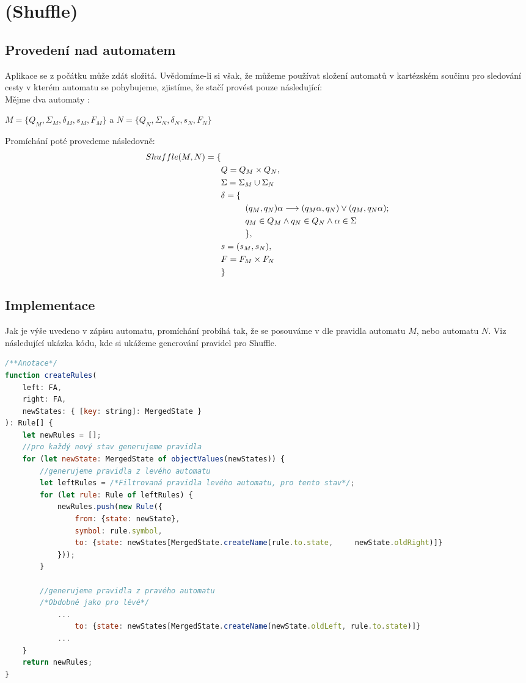 \section{(Shuffle)}
\subsection{Provedení nad automatem}
Aplikace se z počátku může zdát složitá. Uvědomíme-li si však, že můžeme používat složení automatů v kartézském součinu pro sledování cesty v kterém automatu se pohybujeme, zjistíme, že stačí provést pouze následující:\\
Mějme dva automaty :

$M=\{Q_{M}, \Sigma_{M}, \delta_{M},s_{M}, F_{M}\}$ a $N=\{Q_{N}, \Sigma_{N}, \delta_{N},s_{N}, F_{N}\} $

Promíchání poté provedeme následovně:
\begin{equation}
\label{eqA:Intersection}
\begin{split}
Shuffle(M,N) = \{ &\\
 & Q = Q_{M} \times Q_{N},\\
 &   \Sigma = \Sigma_{M} \cup \Sigma_{N} \\
    &   \delta = \{ \\
    & \hspace*{1cm} (q_{M},q_{N})\alpha \longrightarrow (q_{M}\alpha, q_{N}) \vee (q_{M},q_{N}\alpha);\\
    & \hspace*{1cm} q_{M} \in Q_{M} \land q_{N} \in Q_{N} \land \alpha \in \Sigma\\
    & \hspace*{1cm} \}, \\
    &  s = (s_{M}, s_{N}), \\
    & F = F_{M} \times F_{N} \\
    & \}
\end{split}
\end{equation}

\subsection{Implementace}
Jak je výše uvedeno v zápisu automatu, promíchání probíhá tak, že se posouváme v dle pravidla automatu $M$, nebo automatu $N$. Viz následující ukázka kódu, kde si ukážeme generování pravidel pro Shuffle.
\begin{lstlisting}[language=JavaScript, caption={Ukázka generování přechodů pro shuffle (\textit{src/operations/shuffleFA.js})}, label=example:shuffle]
/**Anotace*/
function createRules(
	left: FA,
	right: FA,
	newStates: { [key: string]: MergedState }
): Rule[] {
	let newRules = [];
	//pro každý nový stav generujeme pravidla
	for (let newState: MergedState of objectValues(newStates)) {
		//generujeme pravidla z levého automatu
		let leftRules = /*Filtrovaná pravidla levého automatu, pro tento stav*/;
		for (let rule: Rule of leftRules) {
			newRules.push(new Rule({
				from: {state: newState},
				symbol: rule.symbol,
				to: {state: newStates[MergedState.createName(rule.to.state, 	newState.oldRight)]}
			}));
		}

		//generujeme pravidla z pravého automatu
		/*Obdobně jako pro lévé*/
			...
				to: {state: newStates[MergedState.createName(newState.oldLeft, rule.to.state)]}
			...
	}
	return newRules;
}

\end{lstlisting}